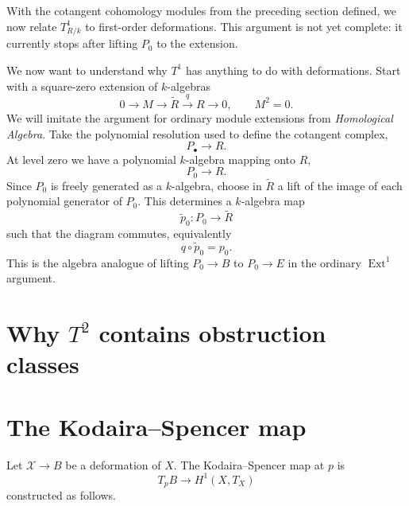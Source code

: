 \medskip\noindent
With the cotangent cohomology modules
from the preceding section defined,
we now relate $T^1_{R/k}$ to first-order
deformations. This argument is not yet
complete: it currently stops after
lifting $P_0$ to the extension.

\noindent
We now want to understand why $T^1$ has anything to do with deformations. Start with a square-zero extension of $k$-algebras
$$
0\longrightarrow M\longrightarrow\widetilde R
\xrightarrow{q}R\longrightarrow0,
\qquad M^2=0.
$$
We will imitate the argument for ordinary module extensions from \emph{Homological Algebra}. Take the polynomial resolution used to define the cotangent complex,
$$
P_\bullet\longrightarrow R.
$$
At level zero we have a polynomial $k$-algebra mapping onto $R$,
$$
P_0\longrightarrow R.
$$
Since $P_0$ is freely generated as a $k$-algebra, choose in $\widetilde R$ a lift of the image of each polynomial generator of $P_0$. This determines a $k$-algebra map
$$
\widetilde p_0:P_0\longrightarrow\widetilde R
$$
such that the diagram commutes, equivalently
$$
q\circ\widetilde p_0=p_0.
$$
This is the algebra analogue of lifting $P_0\to B$ to $P_0\to E$ in the ordinary $\operatorname{Ext}^1$ argument.

\section{Why $T^2$ contains
obstruction classes}
\label{section-obstruction-classes}

\section{The Kodaira--Spencer map}
\label{section-kodaira-spencer-map}

\noindent
Let $\mathcal{X} \to B$ be a
deformation of $X$.
The Kodaira--Spencer map at $p$ is
$$
T_pB \to H^1(X,T_X)
$$
constructed as follows.

